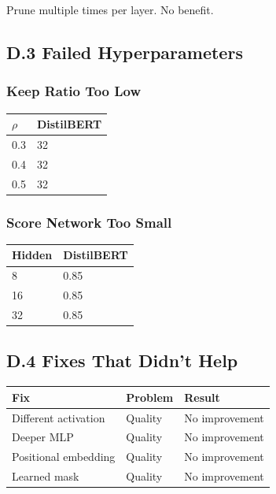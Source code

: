 Prune multiple times per layer. No benefit.

\subsection{D.3 Failed Hyperparameters}

\subsubsection{Keep Ratio Too Low}
\begin{table}[H]
\centering
\small
\begin{tabular}{ll}
\toprule
\textbf{$\rho$} & \textbf{DistilBERT} \\
\midrule
0.3 & 32 \\
0.4 & 32 \\
0.5 & 32 \\
\bottomrule
\end{tabular}
\end{table}

\subsubsection{Score Network Too Small}
\begin{table}[H]
\centering
\small
\begin{tabular}{ll}
\toprule
\textbf{Hidden} & \textbf{DistilBERT} \\
\midrule
8 & 0.85 \\
16 & 0.85 \\
32 & 0.85 \\
\bottomrule
\end{tabular}
\end{table}

\subsection{D.4 Fixes That Didn't Help}

\begin{table}[H]
\centering
\small
\begin{tabular}{lll}
\toprule
\textbf{Fix} & \textbf{Problem} & \textbf{Result} \\
\midrule
Different activation & Quality & No improvement \\
Deeper MLP & Quality & No improvement \\
Positional embedding & Quality & No improvement \\
Learned mask & Quality & No improvement \\
\bottomrule
\end{tabular}
\end{table}

